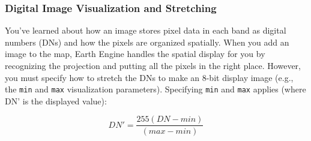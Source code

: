\documentclass[
]{article}
\begin{document}
\hypertarget{digital-image-visualization-and-stretching}{%
\subsubsection{Digital Image Visualization and Stretching}\label{digital-image-visualization-and-stretching}}

You've learned about how an image stores pixel data in each band as digital numbers (DNs) and how the pixels are organized spatially. When you add an image to the map, Earth Engine handles the spatial display for you by recognizing the projection and putting all the pixels in the right place. However, you must specify how to stretch the DNs to make an 8-bit display image (e.g., the \texttt{min} and \texttt{max} visualization parameters). Specifying \texttt{min} and \texttt{max} applies (where DN' is the displayed value):

\[ DN' =   \frac{ 255 (DN - min)}{(max - min)} \]
\end{document}

